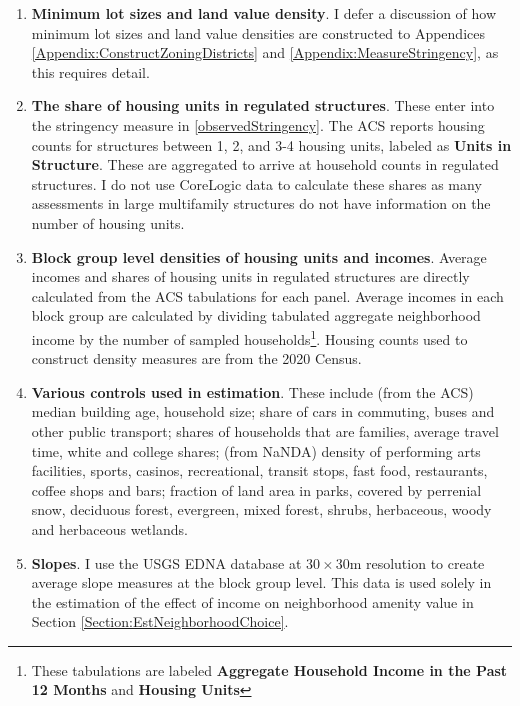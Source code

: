 \documentclass[12pt]{article}
\begin{document}
	\begin{enumerate}
		\item \textbf{Minimum lot sizes and land value density}. I defer a discussion of how minimum lot sizes and land value densities are constructed to Appendices \ref{Appendix:ConstructZoningDistricts} and \ref{Appendix:MeasureStringency}, as this requires detail.
		
		\item \textbf{The share of housing units in regulated structures}. These enter into the stringency measure in \eqref{observedStringency}. The ACS reports housing counts for structures between 1, 2, and 3-4 housing units, labeled as \textbf{Units in Structure}. These are aggregated to arrive at household counts in regulated structures. I do not use CoreLogic data to calculate these shares as many assessments in large multifamily structures do not have information on the number of housing units. 
		
		\item \textbf{Block group level densities of housing units and incomes}.  Average incomes and shares of housing units in regulated structures are directly calculated from the ACS tabulations for each panel. Average incomes in each block group are calculated by dividing tabulated aggregate neighborhood income by the number of sampled households\footnote{These tabulations are labeled \textbf{Aggregate Household Income in the Past 12 Months} and \textbf{Housing Units}}. Housing counts used to construct density measures are from the 2020 Census.
		
		\item \textbf{Various controls used in estimation}. These include (from the ACS) median building age, household size; share of cars in commuting, buses and other public transport; shares of households that are families, average travel time, white and college shares; (from NaNDA) density of performing arts facilities, sports, casinos, recreational, transit stops, fast food, restaurants, coffee shops and bars; fraction of land area in parks, covered by perrenial snow, deciduous forest, evergreen, mixed forest, shrubs, herbaceous, woody and herbaceous wetlands. 
		
		\item \textbf{Slopes}. I use the USGS EDNA database at $30 \times 30$m resolution to create average slope measures at the block group level. This data is used solely in the estimation of the effect of income on neighborhood amenity value in Section \ref{Section:EstNeighborhoodChoice}. 
	\end{enumerate}
	
\end{document}
